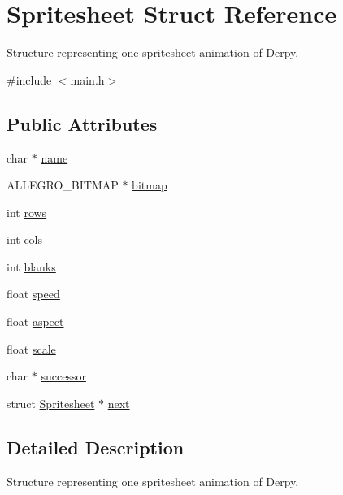 \hypertarget{structSpritesheet}{\section{Spritesheet Struct Reference}
\label{structSpritesheet}
}


Structure representing one spritesheet animation of Derpy.  




{\ttfamily \#include $<$main.\-h$>$}

\subsection*{Public Attributes}
\begin{DoxyCompactItemize}
\item 
char $\ast$ \hyperlink{structSpritesheet_a6788d53f825bd74cda7e50e75435befa}{name}
\item 
A\-L\-L\-E\-G\-R\-O\-\_\-\-B\-I\-T\-M\-A\-P $\ast$ \hyperlink{structSpritesheet_ad31be6e59349586862e6a813ea139bcb}{bitmap}
\item 
int \hyperlink{structSpritesheet_aeab321ce6cdd45cc8a5078e80480510e}{rows}
\item 
int \hyperlink{structSpritesheet_a3d512755ce492a35e1816fe026cc37c9}{cols}
\item 
int \hyperlink{structSpritesheet_a5010b18959949b1c577078f94a810ef3}{blanks}
\item 
float \hyperlink{structSpritesheet_ad011770ca540de2bad85f0cb155c774b}{speed}
\item 
float \hyperlink{structSpritesheet_a85c93c8d80227725374e1581c4c8e049}{aspect}
\item 
float \hyperlink{structSpritesheet_ac46cf3d01609f66aae140e3b7d3d1109}{scale}
\item 
char $\ast$ \hyperlink{structSpritesheet_a8132723c6e2d6b939b11852062eefe67}{successor}
\item 
struct \hyperlink{structSpritesheet}{Spritesheet} $\ast$ \hyperlink{structSpritesheet_a671f77f759138aa2c852e5252b6daac5}{next}
\end{DoxyCompactItemize}


\subsection{Detailed Description}
Structure representing one spritesheet animation of Derpy. 

